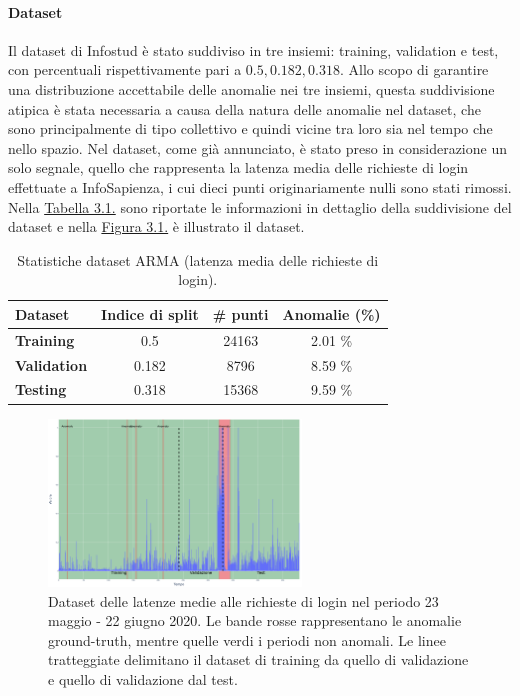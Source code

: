     \paragraph{Dataset}Il dataset di Infostud è stato suddiviso in tre insiemi: training, validation e
    test, con percentuali rispettivamente pari a $0.5, 0.182, 0.318$. Allo scopo di 
    garantire una distribuzione accettabile delle anomalie nei tre insiemi, questa suddivisione atipica è stata 
    necessaria a causa della natura delle anomalie nel dataset, che sono principalmente di tipo collettivo 
    e quindi vicine tra loro sia nel tempo che nello spazio.
    Nel dataset, come già annunciato, è stato preso in considerazione un solo segnale, quello che rappresenta 
    la latenza media delle richieste di login effettuate a InfoSapienza, i cui dieci punti originariamente nulli 
    sono stati rimossi.
    Nella \hyperref[tab:dataset-arma]{Tabella 3.1.} sono riportate le informazioni in dettaglio della suddivisione 
    del dataset e nella \hyperref[fig:dataset-arma]{Figura 3.1.} è illustrato il dataset.

    \begin{table}[H]
        \centering
        \caption{Statistiche dataset ARMA (latenza media delle richieste di login).}
        \begin{tabular}{lccc}
            \toprule
            \textbf{Dataset} & \textbf{Indice di split} & \textbf{\# punti} & \textbf{Anomalie (\%)} \\
            \midrule
            \textbf{Training} & 0.5 & 24163 & 2.01 \% \\
            \textbf{Validation} & 0.182 & 8796 & 8.59 \% \\
            \textbf{Testing} & 0.318 & 15368 & 9.59 \% \\
            \bottomrule
        \end{tabular}
        \label{tab:dataset-arma}
    \end{table}

    \begin{figure}[H]
        \centering
        \includegraphics[width=0.6\textwidth]{./input/chapters/models/figs/arma-dataset.png}
        \caption{Dataset delle latenze medie alle richieste di login nel periodo 23 maggio - 22 giugno 2020. 
        Le bande rosse rappresentano le anomalie ground-truth, mentre quelle verdi i periodi non anomali. 
        Le linee tratteggiate delimitano il dataset di training da quello di validazione e quello di validazione dal test.}
        \label{fig:dataset-arma}
    \end{figure}

